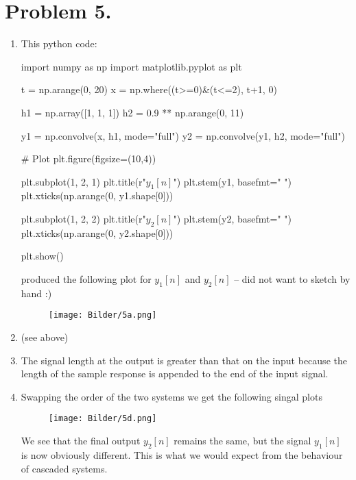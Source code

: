 \documentclass[a4paper,11pt,norsk]{article}
\begin{document}
\section*{Problem 5.}
\begin{enumerate}
    \item This python code: 
\begin{pythoncode}
import numpy as np
import matplotlib.pyplot as plt

t = np.arange(0, 20)
x = np.where((t>=0)&(t<=2), t+1, 0)

h1 = np.array([1, 1, 1])
h2 = 0.9 ** np.arange(0, 11)

y1 = np.convolve(x, h1, mode="full")
y2 = np.convolve(y1, h2, mode="full")

# Plot
plt.figure(figsize=(10,4))

plt.subplot(1, 2, 1)
plt.title(r"$y_1[n]$")
plt.stem(y1, basefmt=" ")
plt.xticks(np.arange(0, y1.shape[0]))

plt.subplot(1, 2, 2)
plt.title(r"$y_2[n]$")
plt.stem(y2, basefmt=" ")
plt.xticks(np.arange(0, y2.shape[0]))

plt.show()
\end{pythoncode}
        produced the following plot for $y_1[n]$ and $y_2[n]$ -- did not want to sketch by hand :)
        \begin{figure}[H]
            \center
            \texttt{[image: Bilder/5a.png]}
        \end{figure}
    \item (see above)
    \item The signal length at the output is greater than that on the input because the length of the 
        sample response is appended to the end of the input signal.
    \item Swapping the order of the two systems we get the following singal plots 
        \begin{figure}[H]
            \center
            \texttt{[image: Bilder/5d.png]}
        \end{figure}
        We see that the final output $y_2[n]$ remains the same, but the signal $y_1[n]$ is now obviously different.
        This is what we would expect from the behaviour of cascaded systems.
\end{enumerate}
\end{document}
